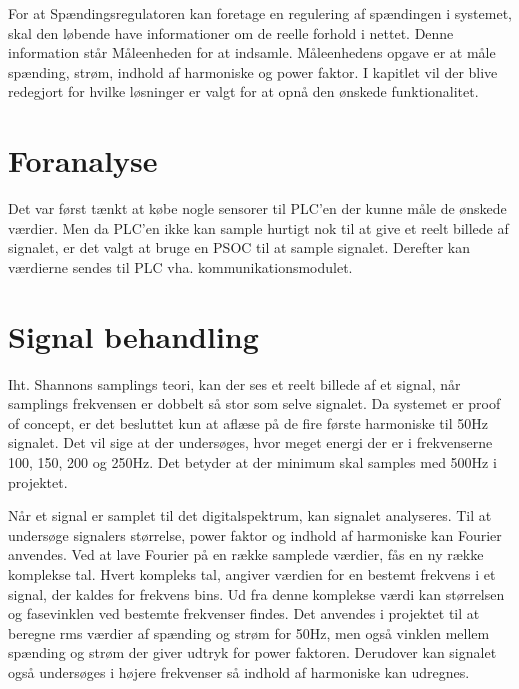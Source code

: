 
For at Spændingsregulatoren kan foretage en regulering af spændingen i systemet, skal den løbende have informationer om de reelle forhold i nettet. Denne information står Måleenheden for at indsamle. Måleenhedens opgave er at måle spænding, strøm, indhold af harmoniske og power faktor. I kapitlet vil der blive redegjort for hvilke løsninger er valgt for at opnå den ønskede funktionalitet. 

\section{Foranalyse}
Det var først tænkt at købe nogle sensorer til PLC'en der kunne måle de ønskede værdier. Men da PLC'en ikke kan sample hurtigt nok til at give et reelt billede af signalet, er det valgt at bruge en PSOC til at sample signalet. Derefter kan værdierne sendes til PLC vha. kommunikationsmodulet.

\section{Signal behandling}

Iht. Shannons samplings teori\cite{Shannon}, kan der ses et reelt billede af et signal, når samplings frekvensen er dobbelt så stor som selve signalet. Da systemet er proof of concept, er det besluttet kun at aflæse på de fire første harmoniske til 50Hz signalet. Det vil sige at der undersøges, hvor meget energi der er i frekvenserne 100, 150, 200 og 250Hz. Det betyder at der minimum skal samples med 500Hz i projektet.

Når et signal er samplet til det digitalspektrum, kan signalet analyseres. Til at undersøge signalers størrelse, power faktor og indhold af harmoniske kan Fourier anvendes. Ved at lave Fourier på en række samplede værdier, fås en ny række komplekse tal. Hvert kompleks tal, angiver værdien for en bestemt frekvens i et signal, der kaldes for frekvens bins. Ud fra denne komplekse værdi kan størrelsen og fasevinklen ved bestemte frekvenser findes. Det anvendes i projektet til at beregne rms værdier af spænding og strøm for 50Hz, men også vinklen mellem spænding og strøm der giver udtryk for power faktoren. Derudover kan signalet også undersøges i højere frekvenser så indhold af harmoniske kan udregnes.  

